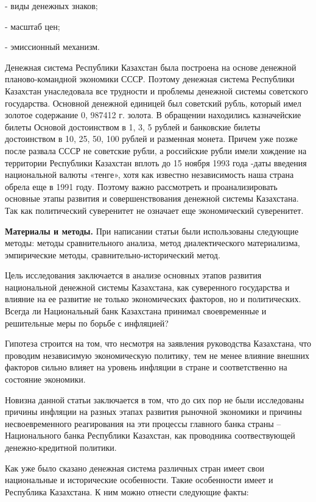 - виды денежных знаков;

- масштаб цен;

- эмиссионный механизм.

Денежная система Республики Казахстан была построена на основе денежной
планово-командной экономики СССР. Поэтому денежная система Республики
Казахстан унаследовала все трудности и проблемы денежной системы
советского государства. Основной денежной единицей был советский рубль,
который имел золотое содержание 0, 987412 г. золота. В обращении
находились казначейские билеты Основой достоинством в 1, 3, 5 рублей и
банковские билеты достоинством в 10, 25, 50, 100 рублей и разменная
монета. Причем уже позже после развала СССР не советские рубли, а
российские рубли имели хождение на территории Республики Казахстан
вплоть до 15 ноября 1993 года -даты введения национальной валюты
«тенге», хотя как известно независимость наша страна обрела еще в 1991
году. Поэтому важно рассмотреть и проанализировать основные этапы
развития и совершенствования денежной системы Казахстана. Так как
политический суверенитет не означает еще экономический суверенитет.

{\bfseries Материалы и методы.} При написании статьи были использованы
следующие методы: методы сравнительного анализа, метод диалектического
материализма, эмпирические методы, сравнительно-исторический метод.

Цель исследования заключается в анализе основных этапов развития
национальной денежной системы Казахстана, как суверенного государства и
влияние на ее развитие не только экономических факторов, но и
политических. Всегда ли Национальный банк Казахстана принимал
своевременные и решительные меры по борьбе с инфляцией?

Гипотеза строится на том, что несмотря на заявления руководства
Казахстана, что проводим независимую экономическую политику, тем не
менее влияние внешних факторов сильно влияет на уровень инфляции в
стране и соответственно на состояние экономики.

Новизна данной статьи заключается в том, что до сих пор не были
исследованы причины инфляции на разных этапах развития рыночной
экономики и причины несвоевременного реагирования на эти процессы
главного банка страны -- Национального банка Республики Казахстан, как
проводника соотвествующей денежно-кредитной политики.

Как уже было сказано денежная система различных стран имеет свои
национальные и исторические особенности. Такие особенности имеет и
Республика Казахстана. К ним можно отнести следующие факты:

